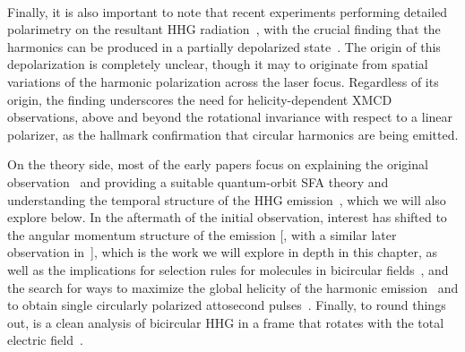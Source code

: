 
$\quad$

Finally, it is also important to note that recent experiments performing detailed polarimetry on the resultant HHG radiation~\cite{veyrinhas_polarimetry-original_2013, veyrinhas_depolarized-hhg-atto_2015, chen_tomographic-hhg-polarimetry_2016}, with the crucial finding that the harmonics can be produced in a partially depolarized state~\cite{veyrinhas_depolarized-hhg-atto_2015}. The origin of this depolarization is completely unclear, though it may to originate from spatial variations of the harmonic polarization across the laser focus. Regardless of its origin, the finding underscores the need for helicity-dependent XMCD observations, above and beyond the rotational invariance with respect to a linear polarizer, as the hallmark confirmation that circular harmonics are being emitted.



On the theory side, most of the early papers focus on explaining the original observation~\cite{EichmannExperiment} and providing a suitable quantum-orbit SFA theory \cite{SFALong, SFAMilosevicBecker,milosevic_hhg-laser-phys_2001} and understanding the temporal structure of the HHG emission~\cite{milosevic_unusual-nonlinear-polarization_2000}, which we will also explore below. In the aftermath of the initial observation, interest has shifted to the angular momentum structure of the emission [\citealp{Ivanov_nature_photonics_2014, Pisanty_spin_conservation_2014}, with a similar later observation in~\citealp{milosevic_bicircular-angular-momentum_2015}], which is the work we will explore in depth in this chapter, as well as the implications for selection rules for molecules in bicircular fields~\cite{reich-madsen_molecular-symmetries_2016, baykusheva_bicircular-hhg-spectroscopy, liu_selection-rules-hhg_2016, mauger_bicircular-molecular-hhg, odzak_polyatomic-bicircular_2016, yuan-bandrauk_circular-hhg-extended-asymmetric-molecules_2011}, and the search for ways to maximize the global helicity of the harmonic emission~\cite{kfir_chiral-phase-matching_2016, milosevic_elliptical-apt_2015, milosevic_circularly_2015, medisauskas_generating_2016} and to obtain single circularly polarized attosecond pulses~\cite{ medisauskas_generating_2016, hernandez_isolated-circular-pulses_2016}. Finally, to round things out, is a clean analysis of bicircular HHG in a frame that rotates with the total electric field~\cite{reich-madsen_rotating-frame-bicircular_2016}.




